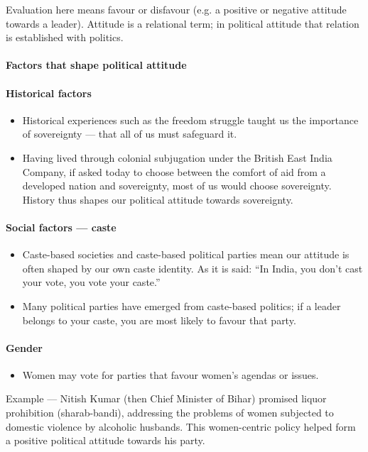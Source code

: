 Evaluation here means favour or disfavour (e.g. a positive or negative attitude towards a leader). Attitude is a relational term; in political attitude that relation is established with politics.

\paragraph{Factors that shape political attitude}

\paragraph{Historical factors}
\begin{itemize}
\item Historical experiences such as the freedom struggle taught us the importance of sovereignty --- that all of us must safeguard it.
\item Having lived through colonial subjugation under the British East India Company, if asked today to choose between the comfort of aid from a developed nation and sovereignty, most of us would choose sovereignty. History thus shapes our political attitude towards sovereignty.
\end{itemize}

\paragraph{Social factors --- caste}
\begin{itemize}
\item Caste-based societies and caste-based political parties mean our attitude is often shaped by our own caste identity. As it is said: ``In India, you don't cast your vote, you vote your caste.''
\item Many political parties have emerged from caste-based politics; if a leader belongs to your caste, you are most likely to favour that party.
\end{itemize}

\paragraph{Gender}
\begin{itemize}
\item Women may vote for parties that favour women's agendas or issues.
\end{itemize}

\begin{GovtPolicy}
Example --- Nitish Kumar (then Chief Minister of Bihar) promised liquor prohibition (sharab-bandi), addressing the problems of women subjected to domestic violence by alcoholic husbands. This women-centric policy helped form a positive political attitude towards his party.
\end{GovtPolicy}


